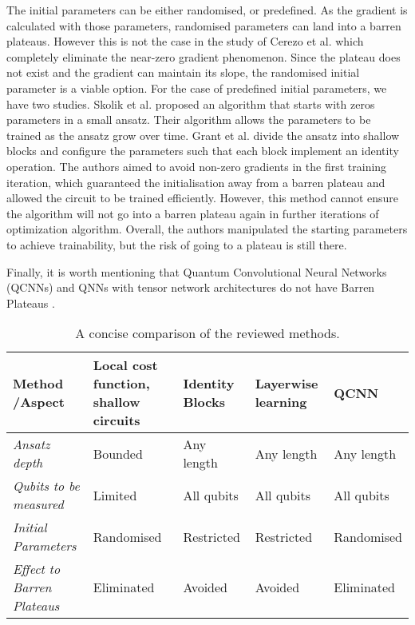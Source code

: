 The initial parameters can be either randomised, or predefined.
As the gradient is calculated with those parameters, randomised parameters can land into a barren plateaus.
However this is not the case in the study of Cerezo et al. which completely eliminate the near-zero gradient phenomenon.
Since the plateau does not exist and the gradient can maintain its slope, the randomised initial parameter is a viable option.
For the case of predefined initial parameters, we have two studies.
Skolik et al. \cite{skolikLayerwiseLearningQuantum2021} proposed an algorithm that starts with zeros parameters in a small ansatz.
Their algorithm allows the parameters to be trained as the ansatz grow over time.
Grant et al. \cite{grantInitializationStrategyAddressing2019} divide the ansatz into shallow blocks and configure the parameters such that each block implement an identity operation.
The authors aimed to avoid non-zero gradients in the first training iteration, which guaranteed the initialisation away from a barren plateau and allowed the circuit to be trained efficiently.
However, this method cannot ensure the algorithm will not go into a barren plateau again in further iterations of optimization algorithm.
Overall, the authors manipulated the starting parameters to achieve trainability, but the risk of going to a plateau is still there.

Finally, it is worth mentioning that Quantum Convolutional Neural Networks (QCNNs) and QNNs with tensor network architectures do not have Barren Plateaus \cite{congQuantumConvolutionalNeural2019}.

\begin{table*}
    \centering
    \begin{tabular}{||p{3cm} p{2cm} p{2cm} p{2cm} p{2cm}||}
        \hline
        \textbf{Method /\newline Aspect}             & \textbf{Local cost function, shallow circuits} & \textbf{Identity Blocks} & \textbf{Layerwise learning} & \textbf{QCNN} \\
        \hline \hline
        \raggedright\emph{Ansatz depth}              & Bounded                                        & Any length               & Any length                  & Any length    \\
        \raggedright\emph{Qubits to be measured}     & Limited                                        & All qubits               & All qubits                  & All qubits    \\
        \raggedright\emph{Initial Parameters}        & Randomised                                     & Restricted               & Restricted                  & Randomised    \\
        \hline \hline
        \raggedright\emph{Effect to Barren Plateaus} & Eliminated                                     & Avoided                  & Avoided                     & Eliminated    \\
        \hline
    \end{tabular}
    \caption{A concise comparison of the reviewed methods.}
    \label{quick comparison of methods}
\end{table*}

